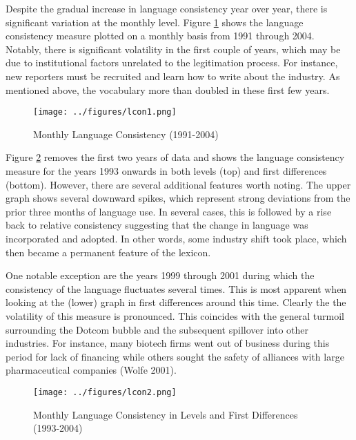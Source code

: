 Despite the gradual increase in language consistency year over year, there is significant variation at the monthly level. Figure \ref{lcon1} shows the language consistency measure plotted on a monthly basis from 1991 through 2004. Notably, there is significant volatility in the first couple of years, which may be due to institutional factors unrelated to the legitimation process. For instance, new reporters must be recruited and learn how to write about the industry. As mentioned above, the vocabulary more than doubled in these first few years. 

\begin{figure}
\begin{center}
\texttt{[image: ../figures/lcon1.png]}
\caption[Monthly Language Consistency (1991-2004)]{Monthly Language Consistency (1991-2004)\label{lcon1}}
\end{center}
\end{figure}

Figure \ref{lcon2} removes the first two years of data and shows the language consistency measure for the years 1993 onwards in both levels (top) and first differences (bottom). However, there are several additional features worth noting. The upper graph shows several downward spikes, which represent strong deviations from the prior three months of language use. In several cases, this is followed by a rise back to relative consistency suggesting that the change in language was incorporated and adopted. In other words, some industry shift took place, which then became a permanent feature of the lexicon.

One notable exception are the years 1999 through 2001 during which the consistency of the language fluctuates several times. This is most apparent when looking at the (lower) graph in first differences around this time. Clearly the the volatility of this measure is pronounced. This coincides with the general turmoil surrounding the Dotcom bubble and the subsequent spillover into other industries. For instance, many biotech firms went out of business during this period for lack of financing while others sought the safety of alliances with large pharmaceutical companies (Wolfe 2001).

\begin{figure}
\begin{center}
\texttt{[image: ../figures/lcon2.png]}
\caption[Monthly Language Consistency, Levels and Differences (1993-2004)]{Monthly Language Consistency in Levels and First Differences (1993-2004)\label{lcon2}}
\end{center}
\end{figure}

